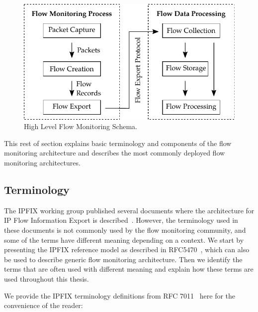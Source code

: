 \begin{figure}[t!]
  \begin{center}
    \includegraphics{figures/c02/flow-monitoring-process}
  \end{center}
  \caption{High Level Flow Monitoring Schema.}
  \label{fig:flow-monitoring-process}
\end{figure}

This rest of section explains basic terminology and components of the flow monitoring architecture and describes the most commonly deployed flow monitoring architectures.

\subsection{Terminology}

The IPFIX working group published several documents where the architecture for IP Flow Information Export is described~\cite{rfc5470, rfc6183}. However, the terminology used in these documents is not commonly used by the flow monitoring community, and some of the terms have different meaning depending on a context. We start by presenting the IPFIX reference model as described in RFC5470~\cite{rfc5470}, which can also be used to describe generic flow monitoring architecture. Then we identify the terms that are often used with different meaning and explain how these terms are used throughout this thesis.

We provide the IPFIX terminology definitions from RFC 7011~\cite{rfc7011} here for the convenience of the reader:

